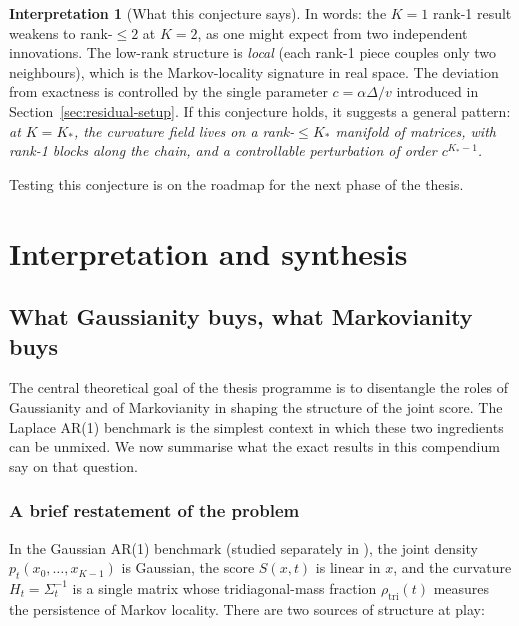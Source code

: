 \documentclass[11pt,a4paper,openany]{book}
\theoremstyle{plainserif}
\theoremstyle{definition}
\theoremstyle{remarkstyle}
\newtheorem*{interpretation}{Interpretation}
\begin{document}
\begin{interpretation}[What this conjecture says]
In words: the $K=1$ rank-1 result weakens to rank-$\leq 2$ at $K=2$, as
one might expect from two independent innovations. The low-rank
structure is \emph{local} (each rank-1 piece couples only two neighbours),
which is the Markov-locality signature in real space. The deviation from
exactness is controlled by the single parameter
$c = \alpha\Delta/v$ introduced in Section~\ref{sec:residual-setup}.
If this conjecture holds, it suggests a general pattern:
\emph{at $K = K_*$, the curvature field lives on a rank-$\leq K_*$
manifold of matrices, with rank-1 blocks along the chain, and a
controllable perturbation of order $c^{K_*-1}$.}

Testing this conjecture is on the roadmap for the next phase of the
thesis.
\end{interpretation}


\part{Interpretation and synthesis}

\chapter{What Gaussianity buys, what Markovianity buys}
\label{ch:interpretation}

The central theoretical goal of the thesis programme is to disentangle
the roles of Gaussianity and of Markovianity in shaping the structure of
the joint score. The Laplace AR(1) benchmark is the simplest context in
which these two ingredients can be unmixed. We now summarise what the
exact results in this compendium say on that question.

\section{A brief restatement of the problem}

In the Gaussian AR(1) benchmark (studied separately in
\cite{structure_sigma_t}), the joint density $p_t(x_0, \ldots, x_{K-1})$
is Gaussian, the score $S(x,t)$ is linear in $x$, and the curvature
$H_t = \Sigma_t^{-1}$ is a single matrix whose tridiagonal-mass
fraction $\rho_{\mathrm{tri}}(t)$ measures the persistence of Markov
locality. There are two sources of structure at play:
\end{document}
